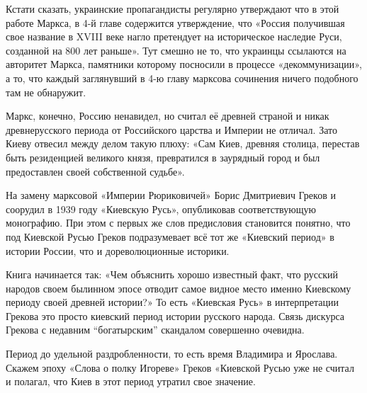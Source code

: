 Кстати сказать, украинские пропагандисты регулярно утверждают что в этой работе
Маркса, в 4-й главе содержится утверждение, что «Россия получившая свое
название в XVIII веке нагло претендует на историческое наследие Руси, созданной
на 800 лет раньше». Тут смешно не то, что украинцы ссылаются на авторитет
Маркса, памятники которому посносили в процессе «декоммунизации», а то, что
каждый заглянувший в 4-ю главу марксова сочинения ничего подобного там не
обнаружит.


Маркс, конечно, Россию ненавидел, но считал её древней страной и никак
древнерусского периода от Российского царства и Империи не отличал. Зато Киеву
отвесил между делом такую плюху: «Сам Киев, древняя столица, перестав быть
резиденцией великого князя, превратился в заурядный город и был предоставлен
своей собственной судьбе».

На замену марксовой «Империи Рюриковичей» Борис Дмитриевич Греков и соорудил в
1939 году «Киевскую Русь», опубликовав соответствующую монографию. При этом с
первых же слов предисловия становится понятно, что под Киевской Русью Греков
подразумевает всё тот же «Киевский период» в истории России, что и
дореволюционные историки.

Книга начинается так: «Чем объяснить хорошо известный факт, что русский народов
своем былинном эпосе отводит самое видное место именно Киевскому периоду своей
древней истории?» То есть «Киевская Русь» в интерпретации Грекова это просто
киевский период истории русского народа. Связь дискурса Грекова с недавним
\enquote{богатырским} скандалом совершенно очевидна.

Период до удельной раздробленности, то есть время Владимира и Ярослава. Скажем
эпоху «Слова о полку Игореве» Греков «Киевской Русью уже не считал и полагал,
что Киев в этот период утратил свое значение.
